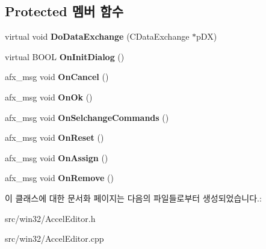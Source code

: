 \subsection*{Protected 멤버 함수}
\begin{DoxyCompactItemize}
\item 
\mbox{\label{class_accel_editor_a3212b434e8c489ba308fa6a474dd32e7}} 
virtual void {\bfseries Do\+Data\+Exchange} (C\+Data\+Exchange $\ast$p\+DX)
\item 
\mbox{\label{class_accel_editor_a131b32f139220aadd5e36b4ddeb8cd58}} 
virtual B\+O\+OL {\bfseries On\+Init\+Dialog} ()
\item 
\mbox{\label{class_accel_editor_a50b1043d4af01df3925f193b7755c05e}} 
afx\+\_\+msg void {\bfseries On\+Cancel} ()
\item 
\mbox{\label{class_accel_editor_a3afd18b4482500a4ea29ee5d0d43cffc}} 
afx\+\_\+msg void {\bfseries On\+Ok} ()
\item 
\mbox{\label{class_accel_editor_a16cb5c73f55199115c5a4f35268ff3fa}} 
afx\+\_\+msg void {\bfseries On\+Selchange\+Commands} ()
\item 
\mbox{\label{class_accel_editor_a1afed0a04125915ae1517e1b08879b8b}} 
afx\+\_\+msg void {\bfseries On\+Reset} ()
\item 
\mbox{\label{class_accel_editor_ad33ae69dcc262dd73595cb33d82c209e}} 
afx\+\_\+msg void {\bfseries On\+Assign} ()
\item 
\mbox{\label{class_accel_editor_a40b74b67b95694245502b15ceedd278c}} 
afx\+\_\+msg void {\bfseries On\+Remove} ()
\end{DoxyCompactItemize}


이 클래스에 대한 문서화 페이지는 다음의 파일들로부터 생성되었습니다.\+:\begin{DoxyCompactItemize}
\item 
src/win32/Accel\+Editor.\+h\item 
src/win32/Accel\+Editor.\+cpp\end{DoxyCompactItemize}
